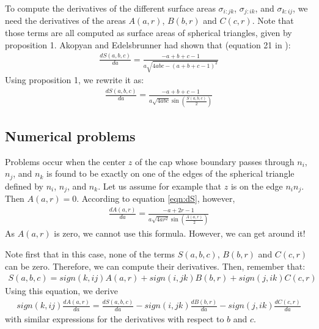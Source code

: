 \documentclass[11 pt]{article}
\theoremstyle{plain} \theorembodyfont{\rmfamily}
\begin{document}
To compute the derivatives of the different surface areas $\sigma_{i:jk}$, $\sigma_{j:ik}$, and $\sigma_{k:ij}$, we need the derivatives of the areas $A(a,r)$, $B(b,r)$ and $C(c,r)$.
Note that those terms are all computed as surface areas of spherical triangles,  given by proposition 1. Akopyan and Edelsbrunner had shown that (equation 21 in \cite{AkEd19b}):
\begin{eqnarray}
\frac{dS(a,b,c)} {da} = \frac{ -a + b + c -1}{a \sqrt{ 4abc - (a+b+c-1)^2}}
\end{eqnarray}
Using proposition 1, we rewrite it as:
\begin{eqnarray}
\frac{dS(a,b,c)} {da} =\frac{ -a + b + c -1}{a \sqrt{4abc} \sin\left( \frac{S(a,b,c)}{2} \right) }
\label{eqn:dS}
\end{eqnarray}

\subsection{Numerical problems}

Problems occur when the center $z$ of the cap whose boundary passes through $n_i$, $n_j$, and $n_k$ is found to be exactly on one of the edges of the spherical triangle defined by $n_i$, $n_j$, and $n_k$. Let us assume for example that $z$ is on the edge $n_i n_j$. Then $A(a,r) = 0$. According to equation \ref{eqn:dS}, however,
\begin{eqnarray}
\frac{dA(a,r)} {da} =\frac{ -a + 2r -1}{a \sqrt{4ar^2} \sin\left( \frac{A(a,r)}{2} \right) }
\label{eqn:dA}
\end{eqnarray}
As $A(a,r)$ is zero, we cannot use this formula. However, we can get around it!

Note first that in this case, none of the terms $S(a,b,c)$, $B(b,r)$ and $C(c,r)$ can be zero. Therefore, we can compute their derivatives. Then, remember that:
\begin{eqnarray}
S(a,b,c) = sign(k,ij) A(a,r) + sign(i,jk) B(b,r) + sign(j,ik) C(c,r)
\end{eqnarray}
Using this equation, we derive
\begin{eqnarray}
sign(k,ij) \frac{dA(a,r)}{da} = \frac{dS(a,b,c)}{da} - sign(i,jk) \frac{dB(b,r)}{da} -  sign(j,ik) \frac{dC(c,r)}{da}
\end{eqnarray}
with similar expressions for the derivatives with respect to $b$ and $c$.

\newpage


{\footnotesize

}
\end{document}
